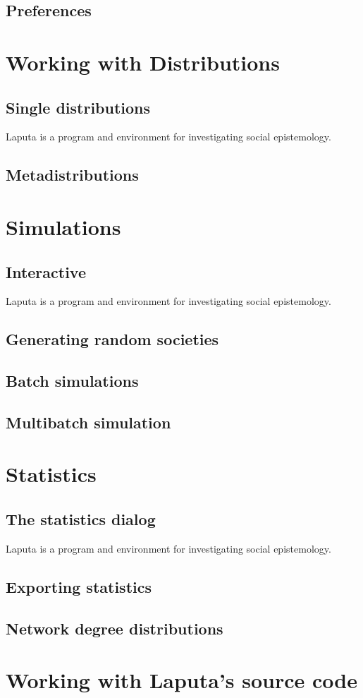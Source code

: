 \documentclass{report}
\begin{document}
\section{Preferences}

\chapter{Working with Distributions}

\section{Single distributions}
Laputa is a program and environment for investigating social epistemology.

\section{Metadistributions}

\chapter{Simulations}

\section{Interactive}
Laputa is a program and environment for investigating social epistemology.


\section{Generating random societies}

\section{Batch simulations}


\section{Multibatch simulation}


\chapter{Statistics}

\section{The statistics dialog}
Laputa is a program and environment for investigating social epistemology.

\section{Exporting statistics}

\section{Network degree distributions}



\chapter{Working with Laputa's source code}
\end{document}
